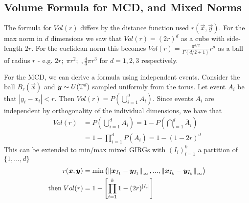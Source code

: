 \subsection{Volume Formula for MCD, and Mixed Norms}
The formula for $Vol(r)$ differs by the distance function used $r(\vec{x}, \vec{y})$. For the max norm in $d$ dimensions we saw that $Vol(r) = (2r)^d$ as a cube with side-length $2r$. For the euclidean norm this becomes $Vol(r) = \frac{\pi^{d/2}}{\Gamma(d/2 + 1)} r^d$ as a ball of radius $r$ - e.g. $2r;\; \pi r^2;\;, \frac{4}{3} \pi r^3$ for $d=1, 2, 3$ respectively.

For the MCD, we can derive a formula using independent events. Consider the ball $B_r(\vec{x})$ and $\bm{y} \sim U(\mathbb{T}^d)$ sampled uniformly from the torus. Let event $A_i$ be that $|y_i - x_i| < r$. Then $Vol(r) = P(\bigcup_{i=1}^d A_i)$. Since events $A_i$ are independent by orthogonality of the individual dimensions,
we have that
\begin{align*}
    Vol(r) & = P \left (\bigcup_{i=1}^d A_i \right ) 
    = 1 - P \left ( \bigcap_{i=1}^d \overline{A}_i \right )
    \\
    &= 1 - \prod_{i=1}^d P(\overline{A}_i) = 1 - (1 - 2r)^d
\end{align*}
This can be extended to min/max mixed GIRGs with $(I_i)_{i=1}^k$ a partition of $\{1, ..., d\}$
\begin{align*}
    r(\bm{x}, \bm{y}) &= \min \left ( \left\lVert \bm{x}_{I_1} - \bm{y}_{I_1}\right\rVert_\infty, ..., \left\lVert \bm{x}_{I_k} - \bm{y}_{I_k}\right\rVert_\infty  \right )
    \\
    \text{then}\; Vol(r) &= 1 -  \left [ \prod_{i=1}^k 1 - (2r)^{|I_i|} \right ]
\end{align*}









